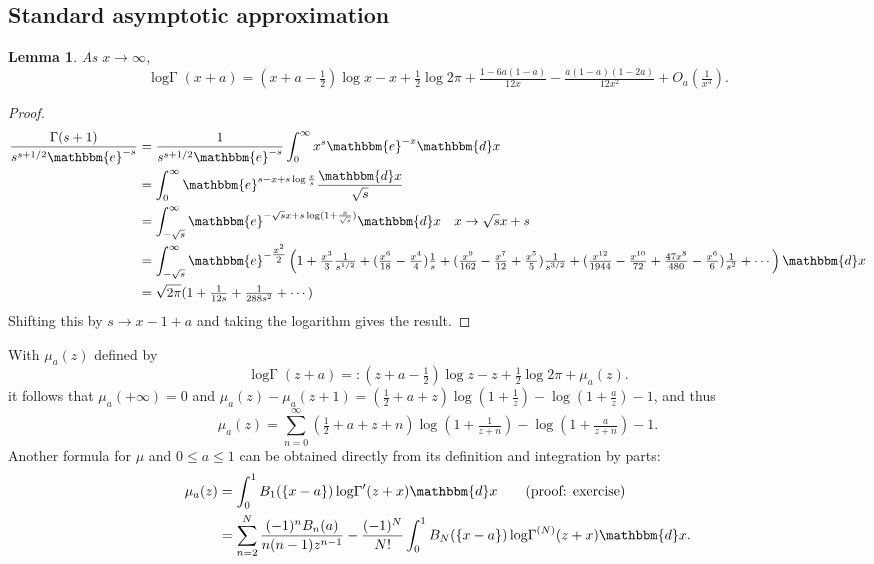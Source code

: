 \documentclass[12pt]{article}
\newcommand{\ee}[0] {\mathbbm{e}}
\newcommand{\dd}[0] {\mathbbm{d}}
\newcommand{\logG} {\operatorname {log \Gamma}}
\numberwithin{equation}{section}
\newtheorem{lemma}[theorem]{Lemma}
\begin{document}
\subsection{Standard asymptotic approximation}
\begin{lemma}
\label{lemma_gamma_asymp1}
As $x \to \infty$,
\begin{equation*}
\logG (x + a) = (x+a-\tfrac{1}{2}) \log x - x + \tfrac{1}{2} \log 2\pi + \tfrac{1-6a(1-a)}{12x} - \tfrac{a(1-a)(1-2a)}{12x^2} + O_a(\tfrac{1}{x^3}).
\end{equation*}
\end{lemma}
\begin{proof}
\begin{align*}
\frac{\Gamma(s+1)}{s^{s+1/2} \ee^{-s}} &= \frac{1}{{s^{s+1/2} \ee^{-s}}} \int_{0}^{\infty} x^s \ee^{-x} \dd x \\
&= \int_{0}^{\infty} \ee^{s-x+s\log \frac{x}{s}} \frac{\dd x}{\sqrt{s}} \\
&= \int_{-\sqrt{s}}^{\infty} \ee^{-\sqrt{s} x+s\log( 1+\frac{x}{\sqrt{s}})} \dd x \quad x \to \sqrt{s}x+s\\
&=\int_{-\sqrt{s}}^{\infty} \ee^{-\tfrac{x^2}{2}} \left(1+\tfrac{x^3}{3} \tfrac{1}{s^{1/2}}+(\tfrac{x^6}{18}-\tfrac{x^4}{4})\tfrac{1}{s}+(\tfrac{x^9}{162}-\tfrac{x^7}{12}+\tfrac{x^5}{5})\tfrac{1}{s^{3/2}} + (\tfrac{x^{12}}{1944}-\tfrac{x^{10}}{72}+\tfrac{47 x^8}{480}-\tfrac{x^6}{6}) \tfrac{1}{s^2} + \cdots\right) \dd x\\
&= \sqrt{2\pi} ( 1 + \tfrac{1}{12s} + \tfrac{1}{288s^2} + \cdots )
\end{align*}
Shifting this by $s \to x-1+a$ and taking the logarithm gives the result.
\end{proof}

With $\mu_a(z)$ defined by
\begin{equation*}
\logG(z + a) =: (z+a-\tfrac{1}{2}) \log z - z + \tfrac{1}{2} \log 2\pi + \mu_a(z).
\end{equation*}
it follows that $\mu_a(+\infty) = 0$ and $\mu_a(z)-\mu_a(z+1) = (\tfrac{1}{2}+a+z) \log(1+\frac{1}{z}) - \log(1+\frac{a}{z}) - 1$, and thus
\begin{equation*}
\mu_a(z) = \sum_{n=0}^{\infty} (\tfrac{1}{2}+a+z+n) \log(1+\tfrac{1}{z+n}) - \log(1+\tfrac{a}{z+n}) - 1\text{.}
\end{equation*}
Another formula for $\mu$ and $0 \le a \le 1$ can be obtained directly from its definition and integration by parts:
\begin{align*}
\mu_a (z) &= \int_{0}^{1} B_1(\{x-a\}) \logG'(z+x)\dd x \quad \quad 
\text{(proof: exercise)}\\
&= \sum_{n=2}^{N} \frac{(-1)^n B_n(a)}{n(n-1) z^{n-1}} - \frac{(-1)^N}{N!} \int_{0}^{1} B_{N}(\{x-a\}) \logG^{(N)}(z+x)\dd x \text{.}
\end{align*}
\end{document}
